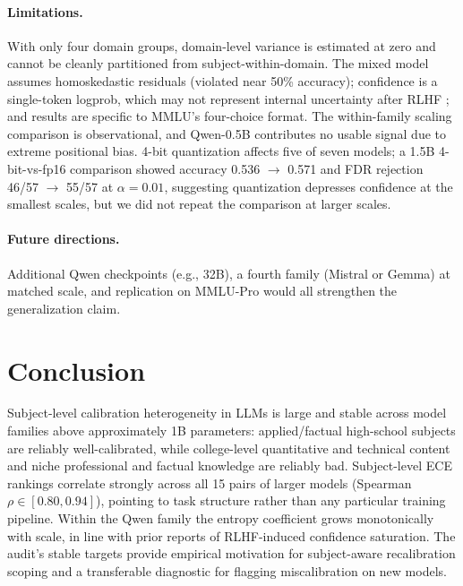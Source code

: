 \documentclass[11pt]{article}
\begin{document}
\paragraph{Limitations.}
With only four domain groups, domain-level variance is estimated at zero and
cannot be cleanly partitioned from subject-within-domain. The mixed model
assumes homoskedastic residuals (violated near 50\% accuracy); confidence is a
single-token logprob, which may not represent internal uncertainty after RLHF
\citep{kadavath2022language}; and results are specific to MMLU's four-choice
format. The within-family scaling comparison is observational, and Qwen-0.5B
contributes no usable signal due to extreme positional bias. 4-bit
quantization affects five of seven models; a 1.5B 4-bit-vs-fp16 comparison
showed accuracy 0.536 $\to$ 0.571 and FDR rejection 46/57 $\to$ 55/57 at
$\alpha=0.01$, suggesting quantization depresses confidence at the smallest
scales, but we did not repeat the comparison at larger scales.

\paragraph{Future directions.}
Additional Qwen checkpoints (e.g., 32B), a fourth family (Mistral or Gemma)
at matched scale, and replication on MMLU-Pro would all strengthen the
generalization claim.

\section{Conclusion}

Subject-level calibration heterogeneity in LLMs is large and stable across
model families above approximately 1B parameters: applied/factual high-school
subjects are reliably well-calibrated, while college-level quantitative and
technical content and niche professional and factual knowledge are reliably
bad. Subject-level ECE rankings correlate strongly across all 15 pairs of
larger models (Spearman $\rho \in [0.80, 0.94]$), pointing to task structure
rather than any particular training pipeline. Within the Qwen family the
entropy coefficient grows monotonically with scale, in line with prior
reports of RLHF-induced confidence saturation. The audit's stable targets
provide empirical motivation for subject-aware recalibration scoping and a
transferable diagnostic for flagging miscalibration on new models.
\end{document}
